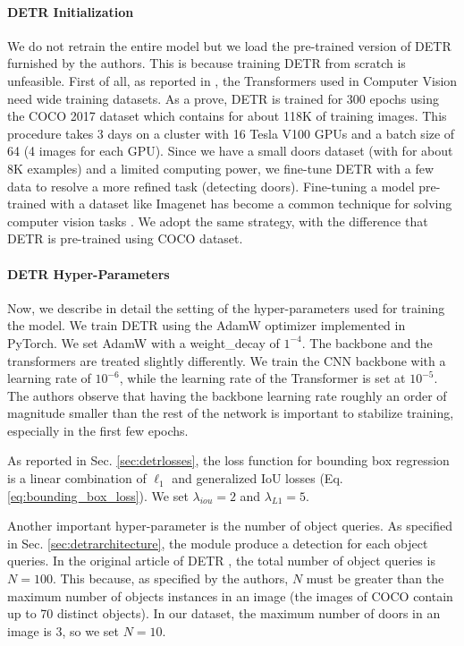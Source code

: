\paragraph{DETR Initialization}
We do not retrain the entire model but we load the pre-trained version of DETR furnished by the authors. This is because training DETR from scratch is unfeasible. First of all, as reported in \cite{surveytransformer}, the Transformers used in Computer Vision need wide training datasets. As a prove, DETR is trained for 300 epochs using the COCO 2017 dataset \cite{coco} which contains for about 118K of training images. This procedure takes 3 days on a cluster with 16 Tesla V100 GPUs and a batch size of 64 (4 images for each GPU). Since we have a small doors dataset (with for about 8K examples) and a limited computing power, we fine-tune DETR with a few data to resolve a more refined task (detecting doors). Fine-tuning a model pre-trained with a dataset like Imagenet \cite{imagenet} has become a common technique for solving computer vision tasks \cite{verydeepimagenet, resnet, fasterrcnn, yolo, yolov2}. We adopt the same strategy, with the difference that DETR is pre-trained using COCO dataset.

\paragraph{DETR Hyper-Parameters}
Now, we describe in detail the setting of the hyper-parameters used for training the model. We train DETR using the AdamW  \cite{adamw} optimizer implemented in PyTorch. We set AdamW with a \textsf{weight\_decay} of $1^{-4}$. The backbone and the transformers are treated slightly differently.  We train the CNN backbone with a learning rate of $10^{-6}$, while the learning rate of the Transformer is set at $10^{-5}$. The authors observe that having the backbone learning rate roughly an order of magnitude smaller than the rest of the network is important to stabilize training, especially in the first few epochs. 

As reported in Sec. \ref{sec:detrlosses}, the loss function for bounding box regression is a linear combination of $\ell_1$ and generalized IoU \cite{generalizediou} losses (Eq. \ref{eq:bounding_box_loss}). We set $\lambda_{iou} = 2$ and $\lambda_{L1} = 5$.

Another important hyper-parameter is the number of object queries. As specified in Sec. \ref{sec:detrarchitecture}, the module produce a detection for each object queries. In the original article of DETR \cite{detr}, the total number of object queries is  $N = 100$. This because, as specified by the authors, $N$ must be greater than the maximum number of objects instances in an image (the images of COCO contain up to 70 distinct objects). In our dataset, the maximum number of doors in an image is 3, so we set $N = 10$.

